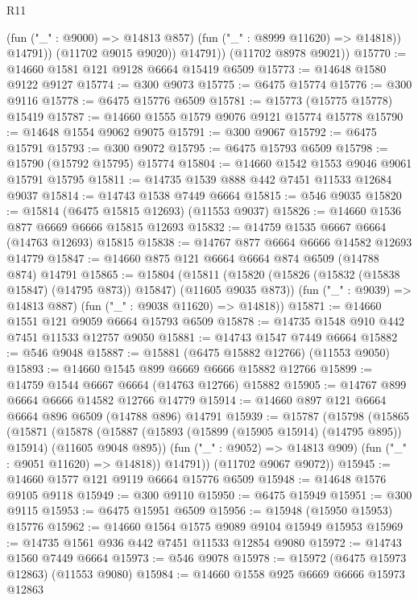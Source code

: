 \begin{lexlean}{R11}
\begin{coremodule}
                  (fun ("_" : @9000) => @14813 @857)
                  (fun ("_" : @8999 @11620) => @14818))
                @14791))
            (@11702 @9015 @9020))
          @14791))
      (@11702 @8978 @9021))
@15770 := @14660 @1581 @121 @9128 @6664 @15419 @6509
@15773 := @14648 @1580 @9122 @9127
@15774 := @300 @9073
@15775 := @6475 @15774
@15776 := @300 @9116
@15778 := @6475 @15776 @6509
@15781 := @15773 (@15775 @15778) @15419
@15787 := @14660 @1555 @1579 @9076 @9121 @15774 @15778
@15790 := @14648 @1554 @9062 @9075
@15791 := @300 @9067
@15792 := @6475 @15791
@15793 := @300 @9072
@15795 := @6475 @15793 @6509
@15798 := @15790 (@15792 @15795) @15774
@15804 := @14660 @1542 @1553 @9046 @9061 @15791 @15795
@15811 := @14735 @1539 @888 @442 @7451 @11533 @12684 @9037
@15814 := @14743 @1538 @7449 @6664
@15815 := @546 @9035
@15820 := @15814 (@6475 @15815 @12693) (@11553 @9037)
@15826 := @14660 @1536 @877 @6669 @6666 @15815 @12693
@15832 := @14759 @1535 @6667 @6664 (@14763 @12693) @15815
@15838 := @14767 @877 @6664 @6666 @14582 @12693 @14779
@15847 := @14660 @875 @121 @6664 @6664 @874 @6509 (@14788 @874) @14791
@15865 := @15804
    (@15811
      (@15820 (@15826 (@15832 (@15838 @15847) (@14795 @873)) @15847) (@11605 @9035 @873))
      (fun ("_" : @9039) => @14813 @887)
      (fun ("_" : @9038 @11620) => @14818))
@15871 := @14660 @1551 @121 @9059 @6664 @15793 @6509
@15878 := @14735 @1548 @910 @442 @7451 @11533 @12757 @9050
@15881 := @14743 @1547 @7449 @6664
@15882 := @546 @9048
@15887 := @15881 (@6475 @15882 @12766) (@11553 @9050)
@15893 := @14660 @1545 @899 @6669 @6666 @15882 @12766
@15899 := @14759 @1544 @6667 @6664 (@14763 @12766) @15882
@15905 := @14767 @899 @6664 @6666 @14582 @12766 @14779
@15914 := @14660 @897 @121 @6664 @6664 @896 @6509 (@14788 @896) @14791
@15939 := @15787
    (@15798
      (@15865
        (@15871
          (@15878
            (@15887 (@15893 (@15899 (@15905 @15914) (@14795 @895)) @15914) (@11605 @9048 @895))
            (fun ("_" : @9052) => @14813 @909)
            (fun ("_" : @9051 @11620) => @14818))
          @14791))
      (@11702 @9067 @9072))
@15945 := @14660 @1577 @121 @9119 @6664 @15776 @6509
@15948 := @14648 @1576 @9105 @9118
@15949 := @300 @9110
@15950 := @6475 @15949
@15951 := @300 @9115
@15953 := @6475 @15951 @6509
@15956 := @15948 (@15950 @15953) @15776
@15962 := @14660 @1564 @1575 @9089 @9104 @15949 @15953
@15969 := @14735 @1561 @936 @442 @7451 @11533 @12854 @9080
@15972 := @14743 @1560 @7449 @6664
@15973 := @546 @9078
@15978 := @15972 (@6475 @15973 @12863) (@11553 @9080)
@15984 := @14660 @1558 @925 @6669 @6666 @15973 @12863

\end{coremodule}
\end{lexlean}
